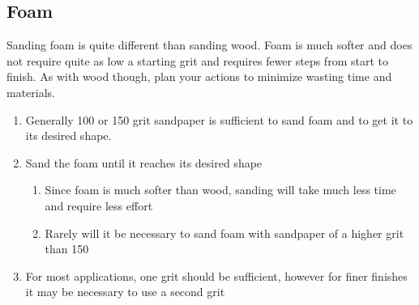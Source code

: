 \subsection{Foam}
Sanding foam is quite different than sanding wood. Foam is much softer and does not require quite as low a starting grit and requires fewer steps from start to finish.  As with wood though, plan your actions to minimize wasting time and materials.
\begin{enumerate}
\item Generally 100 or 150 grit sandpaper is sufficient to sand foam and to get it to its desired shape.
\item Sand the foam until it reaches its desired shape
	\begin{enumerate}
	\item Since foam is much softer than wood, sanding will take much less time and require less effort
	\item Rarely will it be necessary to sand foam with sandpaper of a higher grit than 150
	\end{enumerate}
\item For most applications, one grit should be sufficient, however for finer finishes it may be necessary to use a second grit
\end{enumerate}

